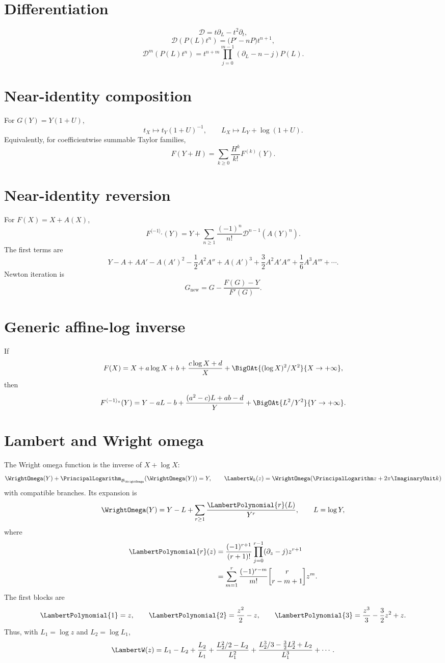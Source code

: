 \documentclass[11pt,oneside]{book}
\theoremstyle{definition}
\theoremstyle{remark}
\newcommand{\D}{\mathcal D}
\newcommand{\compinv}{^{\langle-1\rangle_{\circ}}}
\newcommand{\stirlingone}[2]{\genfrac{[}{]}{0pt}{}{#1}{#2}}
\newcommand{\LogarithmOnBranch}[2]{%
  \PrincipalLogarithm_{#1}\!\left(#2\right)%
}
\begin{document}
\section*{Differentiation}
\[
 \D=t\partial_L-t^2\partial_t,
\]
\[
 \D(P(L)t^n)=\bigl(P'-nP\bigr)t^{n+1},
\]
\[
 \D^m(P(L)t^n)
 =t^{n+m}\prod_{j=0}^{m-1}(\partial_L-n-j)P(L).
\]

\section*{Near-identity composition}
For $G(Y)=Y(1+U)$,
\[
 t_X\mapsto t_Y(1+U)^{-1},
 \qquad
 L_X\mapsto L_Y+\log(1+U).
\]
Equivalently, for coefficientwise summable Taylor families,
\[
 F(Y+H)=\sum_{k\ge0}\frac{H^k}{k!}F^{(k)}(Y).
\]

\section*{Near-identity reversion}
For $F(X)=X+A(X)$,
\begin{equation}\label{eq:quick-LB}
 F\compinv(Y)
 =Y+\sum_{n\ge1}\frac{(-1)^n}{n!}
   \D^{n-1}\!\left(A(Y)^n\right).
\end{equation}
The first terms are
\[
 Y-A+AA'
 -A(A')^2-\frac12A^2A''
 +A(A')^3+\frac32A^2A'A''
 +\frac16A^3A'''+\cdots.
\]
Newton iteration is
\[
 G_{\mathrm{new}}
 =G-\frac{F(G)-Y}{F'(G)}.
\]

\section*{Generic affine-log inverse}
If
\[
 F(X)=X+a\log X+b
 +\frac{c\log X+d}{X}
 +\BigOAt{(\log X)^2/X^2}{X\to+\infty},
\]
then
\[
 F\compinv(Y)
 =Y-aL-b
 +\frac{(a^2-c)L+ab-d}{Y}
 +\BigOAt{L^2/Y^2}{Y\to+\infty}.
\]

\section*{Lambert and Wright omega}
The Wright omega function is the inverse of $X+\log X$:
\[
 \WrightOmega(Y)+\LogarithmOnBranch{\mathcal B_\WrightOmega}{\WrightOmega(Y)}=Y,\qquad
 \LambertW_k(z)=\WrightOmega\!\left(\PrincipalLogarithm z+2\pi\ImaginaryUnit k\right)
\]
with compatible branches. Its expansion is
\[
 \WrightOmega(Y)=Y-L+\sum_{r\ge1}\frac{\LambertPolynomial{r}(L)}{Y^r},
 \qquad L=\log Y,
\]
where
\begin{align*}
 \LambertPolynomial{r}(z)
 &=\frac{(-1)^{r+1}}{(r+1)!}
   \prod_{j=0}^{r-1}(\partial_z-j)z^{r+1}\\
 &=\sum_{m=1}^r
   \frac{(-1)^{r-m}}{m!}
   \stirlingone{r}{r-m+1}z^m.
\end{align*}
The first blocks are
\[
 \LambertPolynomial{1}=z,\qquad
 \LambertPolynomial{2}=\frac{z^2}{2}-z,\qquad
 \LambertPolynomial{3}=\frac{z^3}{3}-\frac32z^2+z.
\]
Thus, with $L_1=\log z$ and $L_2=\log L_1$,
\[
 \LambertW(z)=L_1-L_2+\frac{L_2}{L_1}
 +\frac{L_2^2/2-L_2}{L_1^2}
 +\frac{L_2^3/3-\frac32L_2^2+L_2}{L_1^3}
 +\cdots.
\]
\end{document}
